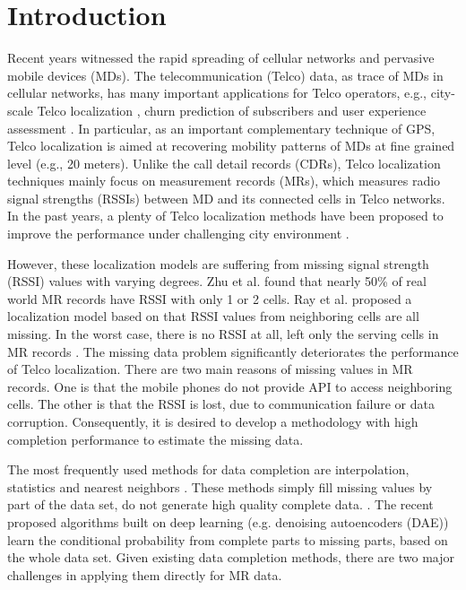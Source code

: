\section{Introduction}
Recent years witnessed the rapid spreading of cellular networks and pervasive mobile devices (MDs). The telecommunication (Telco) data, as trace of MDs in cellular networks, has many important applications for Telco operators, e.g., city-scale Telco localization \cite{DBLP:conf/cikm/ZhuLYZZGDRZ16}, churn prediction of subscribers \cite{DBLP:conf/sigmod/HuangZYDLND0Z15} and user experience assessment \cite{DBLP:journals/tist/LuoZYDY16}. In particular, as an important complementary technique of GPS, Telco localization is aimed at recovering mobility patterns of MDs at fine grained level (e.g., 20 meters). Unlike the call detail records (CDRs), Telco localization techniques mainly focus on measurement records (MRs), which measures radio signal strengths (RSSIs) between MD and its connected cells in Telco networks. In the past years, a plenty of Telco localization methods have been proposed to improve the performance under challenging city environment \cite{DBLP:conf/icc/IbrahimY11, DBLP:conf/icc/HaraAYDZ11,DBLP:journals/tvt/IbrahimY12,DBLP:conf/infocom/RayDM16,DBLP:conf/infocom/MargoliesBBDJUV17}.

However, these localization models are suffering from missing signal strength (RSSI) values with varying degrees. Zhu et al. \cite{DBLP:conf/cikm/ZhuLYZZGDRZ16} found that nearly 50\% of real world MR records have RSSI with only 1 or 2 cells. Ray et al. \cite{DBLP:conf/infocom/RayDM16} proposed a localization model based on that RSSI values from neighboring cells are all missing. In the worst case, there is no RSSI at all, left only the serving cells in MR records \cite{DBLP:conf/gis/PereraBKB15}. The missing data problem significantly deteriorates the performance of Telco localization. There are two main reasons of missing values in MR records. One is that the mobile phones do not provide API to access neighboring cells. The other is that the RSSI is lost, due to communication failure or data corruption. Consequently, it is desired to develop a methodology with high completion performance to estimate the missing data.

The most frequently used methods for data completion are interpolation, statistics and nearest neighbors \cite{DBLP:journals/bioinformatics/TroyanskayaCSBHTBA01}. These methods simply fill missing values by part of the data set, do not generate high quality complete data. . The recent proposed algorithms built on deep learning (e.g. denoising autoencoders (DAE)) \cite{DBLP:conf/pakdd/GondaraW18} learn the conditional probability from complete parts to missing parts, based on the whole data set. Given existing data completion methods, there are two major challenges in applying them directly for MR data.

